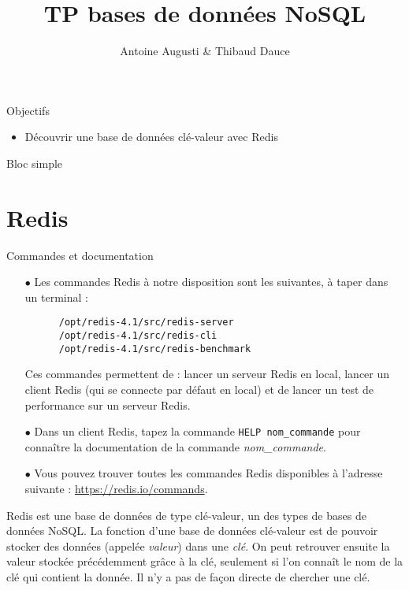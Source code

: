 \documentclass[a4paper,10pt]{article}
\title{TP bases de données NoSQL}
\date{}
\author{Antoine Augusti \& Thibaud Dauce}
\begin{document}
\maketitle
\sloppy
\begin{bclogo}[logo = \bclampe, arrondi = 0.1, ombre = true, epOmbre = 0.2, couleurOmbre = black!30, couleurBord=bleuF, barre=none]{Objectifs}
\begin{itemize}
 \item Découvrir une base de données clé-valeur avec Redis
\end{itemize}

\end{bclogo}


\begin{bclogo}[logo = \bccrayon, noborder=true,barre=none]{}
  Bloc simple
\end{bclogo}

\section{Redis}
  \begin{bclogo}[logo = \bctakecare, arrondi = 0.1, ombre = true , epOmbre = 0.1, couleurOmbre = black!30,  barre =none, couleurBarre=bleuF]{Commandes et documentation}
    \begin{itemize}
    \item[$\bullet$] Les commandes Redis à notre disposition sont les suivantes, à taper dans un terminal :
    \begin{verbatim}
      /opt/redis-4.1/src/redis-server
      /opt/redis-4.1/src/redis-cli
      /opt/redis-4.1/src/redis-benchmark
    \end{verbatim}
    \item[] Ces commandes permettent de : lancer un serveur Redis en local, lancer un client Redis (qui se connecte par défaut en local) et de lancer un test de performance sur un serveur Redis.
    \item[$\bullet$] Dans un client Redis, tapez la commande \texttt{HELP nom\_commande} pour connaître la documentation de la commande \textit{nom\_commande}.
    \item[$\bullet$] Vous pouvez trouver toutes les commandes Redis disponibles à l'adresse suivante : \url{https://redis.io/commands}.

   \end{itemize}
  \end{bclogo}

  Redis est une base de données de type clé-valeur, un des types de bases de données NoSQL. La fonction d'une base de données clé-valeur est de pouvoir stocker des données (appelée \textit{valeur}) dans une \textit{clé}. On peut retrouver ensuite la valeur stockée précédemment grâce à la clé, seulement si l'on connaît le nom de la clé qui contient la donnée. Il n'y a pas de façon directe de chercher une clé.\\
\end{document}
